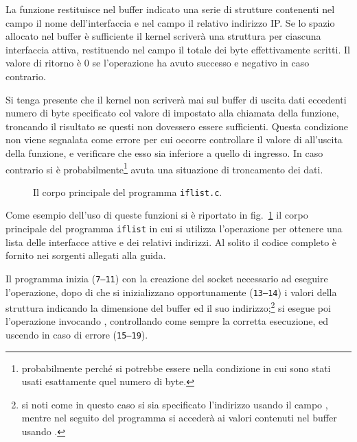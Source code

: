 La funzione restituisce nel buffer indicato una serie di strutture
 contenenti nel campo  il nome dell'interfaccia e
nel campo  il relativo indirizzo IP.  Se lo spazio allocato nel
buffer è sufficiente il kernel scriverà una struttura  per
ciascuna interfaccia attiva, restituendo nel campo  il totale
dei byte effettivamente scritti. Il valore di ritorno è 0 se l'operazione ha
avuto successo e negativo in caso contrario. 

Si tenga presente che il kernel non scriverà mai sul buffer di uscita dati
eccedenti numero di byte specificato col valore di  impostato
alla chiamata della funzione, troncando il risultato se questi non dovessero
essere sufficienti. Questa condizione non viene segnalata come errore per cui
occorre controllare il valore di  all'uscita della funzione, e
verificare che esso sia inferiore a quello di ingresso. In caso contrario si è
probabilmente\footnote{probabilmente perché si potrebbe essere nella
  condizione in cui sono stati usati esattamente quel numero di byte.} avuta
una situazione di troncamento dei dati.

\begin{figure}[!htbp]
  \footnotesize \centering
  \begin{minipage}[c]{\codesamplewidth}
  \end{minipage}
  \caption{Il corpo principale del programma \texttt{iflist.c}.}
  \label{fig:netdevice_iflist}
\end{figure}

Come esempio dell'uso di queste funzioni si è riportato in
fig.~\ref{fig:netdevice_iflist} il corpo principale del programma
\texttt{iflist} in cui si utilizza l'operazione  per
ottenere una lista delle interfacce attive e dei relativi indirizzi. Al solito
il codice completo è fornito nei sorgenti allegati alla guida.

Il programma inizia (\texttt{\small 7--11}) con la creazione del socket
necessario ad eseguire l'operazione, dopo di che si inizializzano
opportunamente (\texttt{\small 13--14}) i valori della struttura
 indicando la dimensione del buffer ed il suo
indirizzo;\footnote{si noti come in questo caso si sia specificato l'indirizzo
  usando il campo , mentre nel seguito del programma si accederà
  ai valori contenuti nel buffer usando .} si esegue poi
l'operazione invocando , controllando come sempre la corretta
esecuzione, ed uscendo in caso di errore (\texttt{\small 15--19}).

